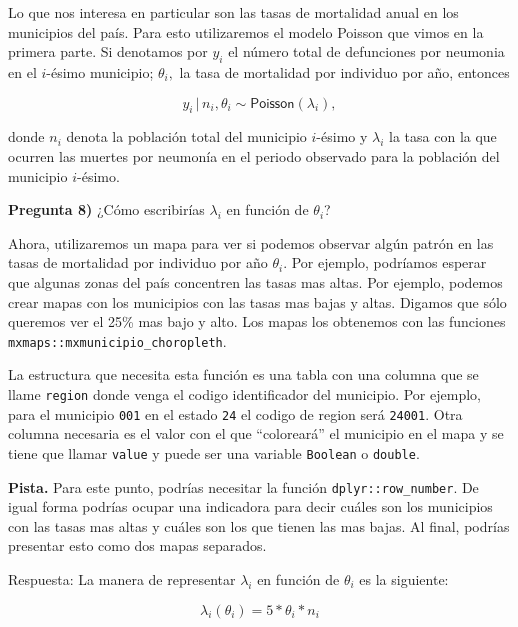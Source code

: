 \documentclass[
]{article}
\begin{document}
Lo que nos interesa en particular son las tasas de mortalidad anual en
los municipios del país. Para esto utilizaremos el modelo Poisson que
vimos en la primera parte. Si denotamos por \(y_i\) el número total de
defunciones por neumonia en el \(i\)-ésimo municipio; \(\theta_i,\) la
tasa de mortalidad por individuo por año, entonces

\[ y_i \, | \, n_i, \theta_i \sim \textsf{Poisson}(\lambda_i),\]

donde \(n_i\) denota la población total del municipio \(i\)-ésimo y
\(\lambda_i\) la tasa con la que ocurren las muertes por neumonía en el
periodo observado para la población del municipio \(i\)-ésimo.

\textbf{Pregunta 8)} ¿Cómo escribirías \(\lambda_i\) en función de
\(\theta_i\)?

Ahora, utilizaremos un mapa para ver si podemos observar algún patrón en
las tasas de mortalidad por individuo por año \(\theta_i.\) Por ejemplo,
podríamos esperar que algunas zonas del país concentren las tasas mas
altas. Por ejemplo, podemos crear mapas con los municipios con las tasas
mas bajas y altas. Digamos que sólo queremos ver el 25\% mas bajo y
alto. Los mapas los obtenemos con las funciones
\texttt{mxmaps::mxmunicipio\_choropleth}.

La estructura que necesita esta función es una tabla con una columna que
se llame \texttt{region} donde venga el codigo identificador del
municipio. Por ejemplo, para el municipio \texttt{001} en el estado
\texttt{24} el codigo de region será \texttt{24001}. Otra columna
necesaria es el valor con el que ``coloreará'' el municipio en el mapa y
se tiene que llamar \texttt{value} y puede ser una variable
\texttt{Boolean} o \texttt{double}.

\textbf{Pista.} Para este punto, podrías necesitar la función
\texttt{dplyr::row\_number}. De igual forma podrías ocupar una
indicadora para decir cuáles son los municipios con las tasas mas altas
y cuáles son los que tienen las mas bajas. Al final, podrías presentar
esto como dos mapas separados.

Respuesta: La manera de representar \(\lambda_i\) en función de
\(\theta_i\) es la siguiente:

\[ \lambda_i(\theta_i) = 5*\theta_i*n_i \]
\end{document}
